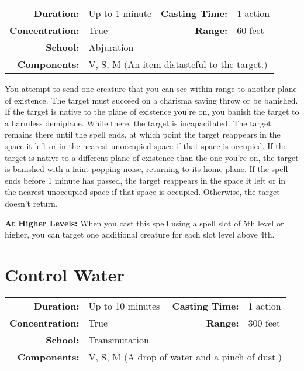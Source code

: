 \documentclass[a5paper, 12pt]{memoir}
\begin{document}
{
\small\centering\vspace{-6pt}
\begin{tabular}{rlrl}
\toprule

\textbf{Duration:} & Up to 1 minute &
\textbf{Casting Time:} & 1 action \\
\textbf{Concentration:} & True &
\textbf{Range:} & 60 feet \\
\textbf{School:} & Abjuration \\
\textbf{Components:} & \multicolumn{3}{p{0.7\textwidth}}{V, S, M (An item distasteful to the target.)}\\

\bottomrule
\end{tabular}
}

\vspace{1\baselineskip}\noindent You attempt to send one creature that you can see within range to another plane of existence. The target must succeed on a charisma saving throw or be banished. If the target is native to the plane of existence you're on, you banish the target to a harmless demiplane. While there, the target is incapacitated. The target remains there until the spell ends, at which point the target reappears in the space it left or in the nearest unoccupied space if that space is occupied. If the target is native to a different plane of existence than the one you're on, the target is banished with a faint popping noise, returning to its home plane. If the spell ends before 1 minute has passed, the target reappears in the space it left or in the nearest unoccupied space if that space is occupied. Otherwise, the target doesn't return.

\vspace{8pt} \noindent\textbf{At Higher Levels:} When you cast this spell using a spell slot of 5th level or higher, you can target one additional creature for each slot level above 4th.
\newpage
\section*{Control Water}

{
\small\centering\vspace{-6pt}
\begin{tabular}{rlrl}
\toprule

\textbf{Duration:} & Up to 10 minutes &
\textbf{Casting Time:} & 1 action \\
\textbf{Concentration:} & True &
\textbf{Range:} & 300 feet \\
\textbf{School:} & Transmutation \\
\textbf{Components:} & \multicolumn{3}{p{0.7\textwidth}}{V, S, M (A drop of water and a pinch of dust.)}\\

\bottomrule
\end{tabular}
}
\end{document}
